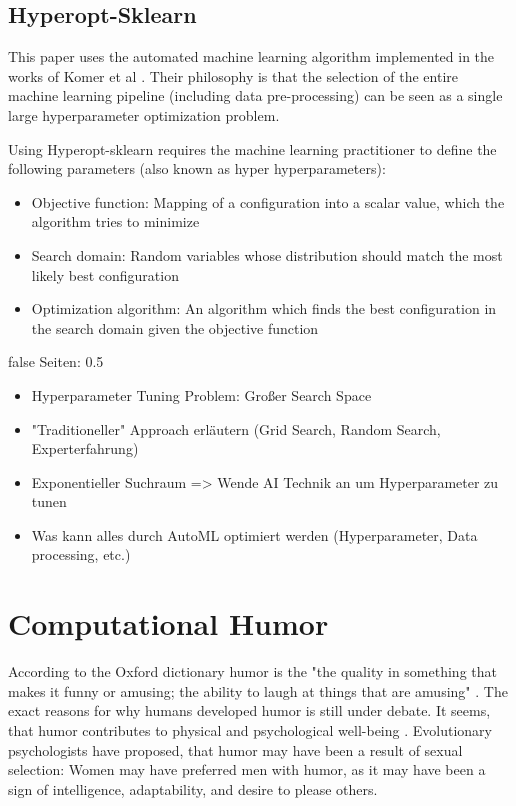 \documentclass[draft,final,oneside]{vutinfth} %
\begin{document}
\subsection{Hyperopt-Sklearn \cite{hyperoptpaper}}

This paper uses the automated machine learning algorithm implemented in the works of Komer et al \cite{hyperoptpaper}. Their philosophy is that the selection of the entire machine learning pipeline (including data pre-processing) can be seen as a single large hyperparameter optimization problem.

Using Hyperopt-sklearn requires the machine learning practitioner to define the following parameters (also known as hyper hyperparameters):
\begin{itemize}
\item Objective function: Mapping of a configuration into a scalar value, which the algorithm tries to minimize
\item Search domain: Random variables whose distribution should match the most likely best configuration 
\item Optimization algorithm: An algorithm which finds the best configuration in the search domain given the objective function
\end{itemize}


\if false
Seiten: 0.5

\begin{itemize}
\item Hyperparameter Tuning Problem: Großer Search Space
\item "Traditioneller" Approach erläutern (Grid Search, Random Search, Experterfahrung)
\item Exponentieller Suchraum => Wende AI Technik an um Hyperparameter zu tunen
\item Was kann alles durch AutoML optimiert werden (Hyperparameter, Data processing, etc.)
\end{itemize}

\fi

\section{Computational Humor} \label{comphumorbackground}

According to the Oxford dictionary humor is the "the quality in something that makes it funny or amusing; the ability to laugh at things that are amusing" \cite{humordef}. The exact reasons for why humans developed humor is still under debate. It seems, that humor contributes to physical and psychological well-being \cite{humorhealthy}. Evolutionary psychologists have proposed, that humor may have been a result of sexual selection: Women may have preferred men with humor, as it may have been a sign of intelligence, adaptability, and desire to please others. \cite{sep-humor}
\end{document}

